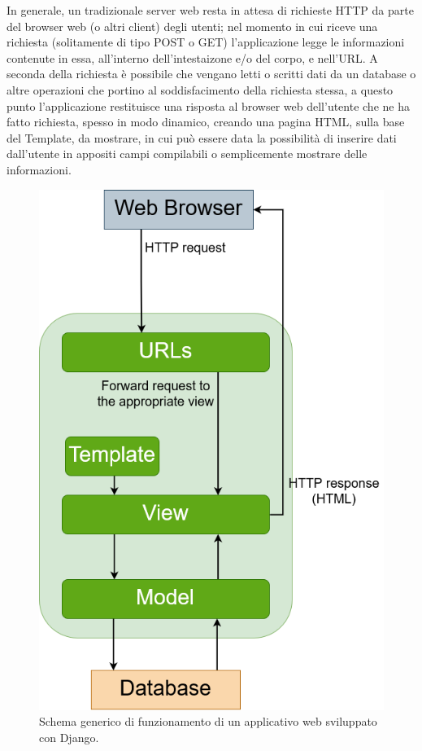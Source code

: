 In generale, un tradizionale server web resta in attesa di richieste HTTP da parte del browser web (o altri client) degli utenti; nel momento in cui riceve 
una richiesta (solitamente di tipo POST o GET) 
l'applicazione legge le informazioni contenute in essa, all'interno dell'intestaizone e/o del corpo, e nell'URL. A seconda della richiesta è possibile che 
vengano letti o scritti dati da un database o altre operazioni che portino al soddisfacimento della richiesta stessa, a questo punto l'applicazione restituisce una 
risposta al browser web dell'utente che ne ha fatto richiesta, spesso in modo dinamico, creando una pagina HTML, sulla base del Template,
da mostrare, in cui può essere data la possibilità di inserire dati dall'utente in appositi campi compilabili o semplicemente mostrare delle informazioni.
%
\newpage
%
\begin{figure}[ht!]
    \centering
    \includegraphics[scale=0.3]{images/Django_doc.png}
    \caption{Schema generico di funzionamento di un applicativo web sviluppato con Django.}
    \label{fig:django_doc}
\end{figure}

